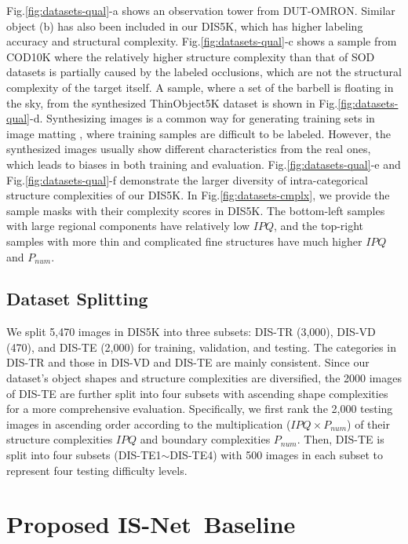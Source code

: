 Fig.\ref{fig:datasets-qual}-a shows an observation tower from DUT-OMRON. Similar object (b) has also been included in our DIS5K, which has higher labeling accuracy and structural complexity.  Fig.\ref{fig:datasets-qual}-c shows a sample from COD10K where the relatively higher structure complexity than that of SOD datasets is partially caused by the labeled occlusions, which are not the structural complexity of the target itself. A sample, where a set of the barbell is floating in the sky, from the synthesized ThinObject5K dataset is shown in Fig.\ref{fig:datasets-qual}-d. Synthesizing images is a common way for generating training sets in image matting \cite{xu2017deep,yu2020high}, where training samples are difficult to be labeled. However, the synthesized images usually show different characteristics from the real ones, which leads to biases in both training and evaluation. Fig.\ref{fig:datasets-qual}-e and Fig.\ref{fig:datasets-qual}-f demonstrate the larger diversity of intra-categorical structure complexities of our DIS5K. In Fig.\ref{fig:datasets-cmplx}, we provide the sample masks with their complexity scores in DIS5K. The bottom-left samples with large regional components have relatively low $IPQ$, and the top-right samples with more thin and complicated fine structures have much higher $IPQ$ and $P_{num}$. 

\subsection{Dataset Splitting}

We split 5,470 images in DIS5K into three subsets: DIS-TR (3,000), DIS-VD (470), and DIS-TE (2,000) for training, validation, and testing. The categories in DIS-TR and those in DIS-VD and DIS-TE are mainly consistent. Since our dataset's object shapes and structure complexities are diversified, the 2000 images of DIS-TE are further split into four subsets with ascending shape complexities for a more comprehensive evaluation. Specifically, we first rank the 2,000 testing images in ascending order according to the multiplication ($IPQ\times P_{num}$) of their structure complexities $IPQ$ and boundary complexities $P_{num}$. Then, DIS-TE is split into four subsets (DIS-TE1$\sim$DIS-TE4) with 500 images in each subset to represent four testing difficulty levels.

\section{Proposed IS-Net~Baseline}


